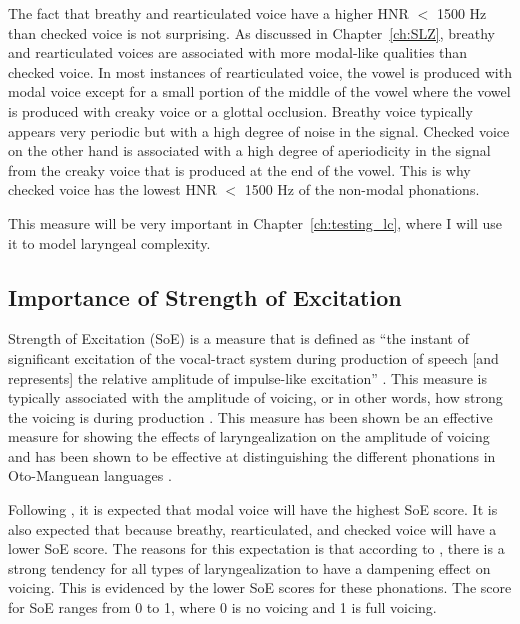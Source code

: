 The fact that breathy and rearticulated voice have a higher HNR $<$ 1500 Hz than checked voice is not surprising. As discussed in Chapter~\ref{ch:SLZ}, breathy and rearticulated voices are associated with more modal-like qualities than checked voice. In most instances of rearticulated voice, the vowel is produced with modal voice except for a small portion of the middle of the vowel where the vowel is produced with creaky voice or a glottal occlusion. Breathy voice typically appears very periodic but with a high degree of noise in the signal. Checked voice on the other hand is associated with a high degree of aperiodicity in the signal from the creaky voice that is produced at the end of the vowel. This is why checked voice has the lowest HNR $<$ 1500 Hz of the non-modal phonations.

This measure will be very important in Chapter~\ref{ch:testing_lc}, where  I will use it to model laryngeal complexity.

\subsection{Importance of Strength of Excitation} \label{sec:dt_soe}

Strength of Excitation (SoE) is a measure that is defined as ``the instant of significant excitation of the vocal-tract system during production of speech [and represents] the relative amplitude of impulse-like excitation'' \citep[1934]{mittalStudyEffectsVocal2014}. This measure is typically associated with the amplitude of voicing, or in other words, how strong the voicing is during production \citep{murtyEpochExtractionSpeech2008,mittalStudyEffectsVocal2014}. This measure has been shown be an effective measure for showing the effects of laryngealization on the amplitude of voicing \citep{garellekVoicingGlottalConsonants2021} and has been shown to be effective at distinguishing the different phonations in Oto-Manguean languages \citep{chaiPhoneticsGlottalizedPhonations2023,wellerInteractionsToneGlottalization2023,wellerLexicalToneVowel2023,wellerVoiceQualityTone2024}.

Following \citet{garellekVoicingGlottalConsonants2021}, it is expected that modal voice will have the highest SoE score. It is also expected that because breathy, rearticulated, and checked voice will have a lower SoE score. The reasons for this expectation is that according to \citet{garellekVoicingGlottalConsonants2021}, there is a strong tendency for all types of laryngealization to have a dampening effect on voicing. This is evidenced by the lower SoE scores for these phonations. The score for SoE ranges from 0 to 1, where 0 is no voicing and 1 is full voicing. 

